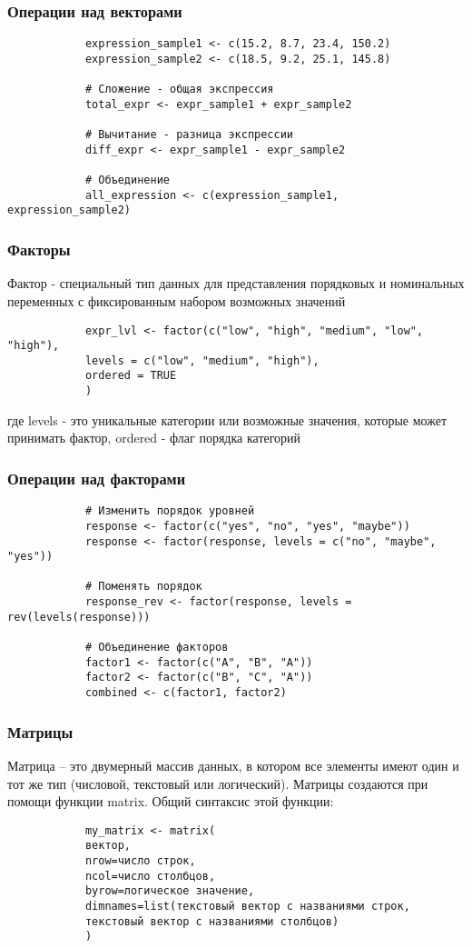 \documentclass[14pt,a4paper]{beamer}
\begin{document}
	\begin{frame}[fragile]
		\frametitle{Операции над векторами}
		\begin{verbatim}
			expression_sample1 <- c(15.2, 8.7, 23.4, 150.2)
			expression_sample2 <- c(18.5, 9.2, 25.1, 145.8)
			
			# Сложение - общая экспрессия
			total_expr <- expr_sample1 + expr_sample2
			
			# Вычитание - разница экспрессии
			diff_expr <- expr_sample1 - expr_sample2
			
			# Объединение
			all_expression <- c(expression_sample1, expression_sample2)
		\end{verbatim}
	\end{frame}
	
	
	\begin{frame}[fragile]
		\frametitle{Факторы}
		Фактор - специальный тип данных для представления порядковых и номинальных переменных с фиксированным набором возможных значений
		\begin{verbatim}
			expr_lvl <- factor(c("low", "high", "medium", "low", "high"),
			levels = c("low", "medium", "high"), 
			ordered = TRUE
			)
		\end{verbatim}
		где levels - это уникальные категории или возможные значения, которые может принимать фактор, ordered - флаг порядка категорий
	\end{frame}
	
	\begin{frame}[fragile]
		\frametitle{Операции над факторами}
		\begin{verbatim}
			# Изменить порядок уровней
			response <- factor(c("yes", "no", "yes", "maybe"))
			response <- factor(response, levels = c("no", "maybe", "yes"))
			
			# Поменять порядок
			response_rev <- factor(response, levels = rev(levels(response)))
			
			# Объединение факторов
			factor1 <- factor(c("A", "B", "A"))
			factor2 <- factor(c("B", "C", "A"))
			combined <- c(factor1, factor2)		
		\end{verbatim}
	\end{frame}
	
	
	\begin{frame}[fragile]
		\frametitle{Матрицы}
		Матрица – это двумерный массив данных, в котором все элементы имеют один и тот же тип (числовой, текстовый или логический). Матрицы создаются при помощи функции matrix. Общий синтаксис этой функции:
		\begin{verbatim}
			my_matrix <- matrix(
			вектор, 
			nrow=число строк, 
			ncol=число столбцов, 
			byrow=логическое значение, 
			dimnames=list(текстовый вектор с названиями строк, 
			текстовый вектор с названиями столбцов)
			)
		\end{verbatim}
		
		
	\end{frame}
	
\end{document}
